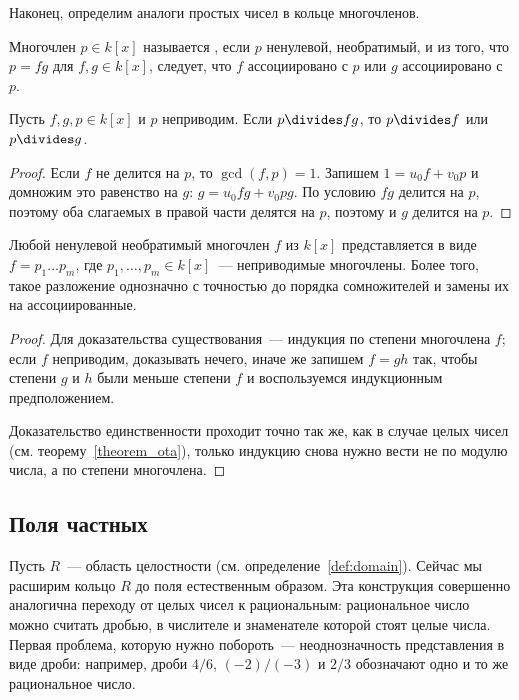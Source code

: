 Наконец, определим аналоги простых чисел в кольце многочленов.

\begin{definition}
Многочлен $p\in k[x]$ называется
, если $p$
ненулевой, необратимый, и из того, что
$p=fg$ для $f,g\in k[x]$, следует, что $f$ ассоциировано с $p$ или $g$
ассоциировано с $p$.
\end{definition}

\begin{lemma}
Пусть $f,g,p\in k[x]$ и $p$ неприводим. Если $p\divides fg$, то
$p\divides f$ или $p\divides g$.
\end{lemma}
\begin{proof}
Если $f$ не делится на $p$, то $\gcd(f,p)=1$. Запишем $1=u_0f+v_0p$ и
домножим это равенство на $g$: $g=u_0fg+v_0pg$. По условию $fg$
делится на $p$, поэтому оба слагаемых в правой части делятся на $p$,
поэтому и $g$ делится на $p$.
\end{proof}

\begin{theorem}
Любой ненулевой необратимый многочлен $f$ из $k[x]$ представляется в
виде $f=p_1\dots p_m$, где $p_1,\dots,p_m\in k[x]$~--- неприводимые
многочлены. Более того, такое разложение однозначно с точностью до
порядка сомножителей и замены их на ассоциированные.
\end{theorem}
\begin{proof}
Для доказательства существования~--- индукция по степени многочлена $f$; если $f$
неприводим, доказывать нечего, иначе же запишем $f=gh$ так, чтобы степени
$g$ и $h$ были меньше степени $f$ и воспользуемся индукционным
предположением.

Доказательство единственности проходит точно так же, как в случае
целых чисел (см. теорему~\ref{theorem_ota}), только индукцию снова
нужно вести не по модулю числа, а по степени многочлена.
\end{proof}


\subsection{Поля частных}


Пусть $R$~--- область целостности
(см. определение~\ref{def:domain}). Сейчас мы расширим кольцо $R$ до
поля естественным образом. Эта конструкция совершенно аналогична
переходу от целых чисел к рациональным: рациональное число можно
считать дробью, в числителе и знаменателе которой стоят целые
числа. Первая проблема, которую нужно побороть~--- неоднозначность
представления в виде дроби: например, дроби $4/6$, $(-2)/(-3)$ и $2/3$
обозначают одно и то же рациональное число.

